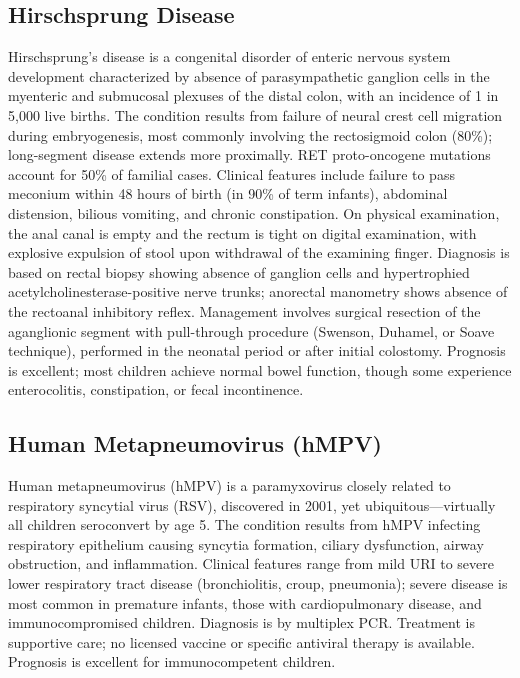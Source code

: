 \subsection{Hirschsprung Disease}
\label{sec:Hirschsprung Disease}
Hirschsprung's disease is a congenital disorder of enteric nervous system development characterized by absence of parasympathetic ganglion cells in the myenteric and submucosal plexuses of the distal colon, with an incidence of 1 in 5,000 live births. The condition results from failure of neural crest cell migration during embryogenesis, most commonly involving the rectosigmoid colon (80\%); long-segment disease extends more proximally. RET proto-oncogene mutations account for 50\% of familial cases. Clinical features include failure to pass meconium within 48 hours of birth (in 90\% of term infants), abdominal distension, bilious vomiting, and chronic constipation. On physical examination, the anal canal is empty and the rectum is tight on digital examination, with explosive expulsion of stool upon withdrawal of the examining finger. Diagnosis is based on rectal biopsy showing absence of ganglion cells and hypertrophied acetylcholinesterase-positive nerve trunks; anorectal manometry shows absence of the rectoanal inhibitory reflex. Management involves surgical resection of the aganglionic segment with pull-through procedure (Swenson, Duhamel, or Soave technique), performed in the neonatal period or after initial colostomy. Prognosis is excellent; most children achieve normal bowel function, though some experience enterocolitis, constipation, or fecal incontinence.

\subsection{Human Metapneumovirus (hMPV)}
\label{sec:pediatric:Human Metapneumovirus}
Human metapneumovirus (hMPV) is a paramyxovirus closely related to respiratory syncytial virus (RSV), discovered in 2001, yet ubiquitous---virtually all children seroconvert by age 5. The condition results from hMPV infecting respiratory epithelium causing syncytia formation, ciliary dysfunction, airway obstruction, and inflammation. Clinical features range from mild URI to severe lower respiratory tract disease (bronchiolitis, croup, pneumonia); severe disease is most common in premature infants, those with cardiopulmonary disease, and immunocompromised children. Diagnosis is by multiplex PCR. Treatment is supportive care; no licensed vaccine or specific antiviral therapy is available. Prognosis is excellent for immunocompetent children.

